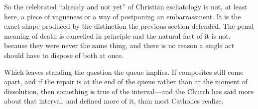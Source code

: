 So the celebrated ``already and not yet'' of Christian eschatology is not, at least here, a piece of vagueness or a way of postponing an embarrassment. It is the exact shape produced by the distinction the previous section defended. The penal meaning of death is cancelled in principle and the natural fact of it is not, because they were never the same thing, and there is no reason a single act should have to dispose of both at once.

Which leaves standing the question the queue implies. If composites still come apart, and if the repair is at the end of the queue rather than at the moment of dissolution, then something is true of the interval---and the Church has said more about that interval, and defined more of it, than most Catholics realize.
